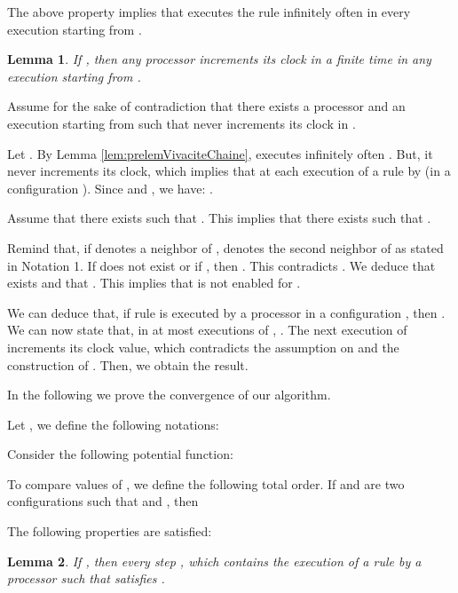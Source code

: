 \documentclass[11pt,english,letterpaper]{article}
\newtheorem{lemma}{Lemma}
\newenvironment{proof}{{\noindent\bf Proof. } }{{\hfill }}
\begin{document}
The above property implies that    executes the rule  infinitely often in every execution starting from .

\begin{lemma}\label{lem:vivaciteChaine}
If , then any processor increments its clock in a finite time in any execution starting from .
\end{lemma}

\begin{proof}
Assume for the sake of contradiction that there exists a processor  and an execution  starting from  such that  never increments its clock in .

Let . By Lemma \ref{lem:prelemVivaciteChaine},  executes infinitely often . But, it never increments its clock, which implies that  at each execution of a rule by  (in a configuration ). Since  and , we have:	.

Assume that there exists  such that . This implies that there exists  such that .

Remind that, if  denotes a neighbor of ,  denotes the second neighbor of  as stated in Notation 1. If  does not exist or if , then  . This contradicts . We deduce that  exists and that . This implies that  is not enabled for .

We can deduce that, if rule  is executed by a processor  in a configuration , then  . We can now state that, in at most  executions of  ,  . The next execution of  increments its clock value, which contradicts the assumption on  and the construction of . Then, we obtain the result. 
\end{proof}

In the following we prove the convergence of our algorithm.

Let , we define the following notations:


Consider the following potential function:


To compare values of , we define the following total order. If  and  are two configurations such that  and , then 


The following properties are satisfied:


\begin{lemma}\label{lem:prelem1ConvergenceChaine}
If , then every step , which contains the execution of a rule by a processor  such that  satisfies .
\end{lemma}
\end{document}
